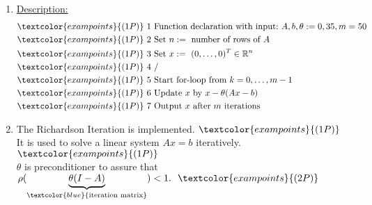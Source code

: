 {\color{solution}
\begin{enumerate}
	\item 
	\underline{Description:}\begin{align*}
	&\textcolor{exampoints}{(1P)}~1~\text{Function declaration with input:}~A,b,\theta:=0,35,m=50\\
	&\textcolor{exampoints}{(1P)}~2~\text{Set}~n:=~\text{number of rows of}~A\\
	&\textcolor{exampoints}{(1P)}~3~\text{Set}~x:=~(0,\dots,0)^T\in\mathbb{R}^n\\
	&\textcolor{exampoints}{(1P)}~4~\text{/}\\
	&\textcolor{exampoints}{(1P)}~5~\text{Start for-loop from}~k=0,\dots,m-1\\
	&\textcolor{exampoints}{(1P)}~6~\text{Update}~x~\text{by}~x-\theta(Ax-b)\\
	&\textcolor{exampoints}{(1P)}~7~\text{Output}~x~\text{after}~m~\text{iterations}
	\end{align*}
	\item 
	The Richardson Iteration is implemented. $\textcolor{exampoints}{(1P)}$\\
	It is used to solve a linear system $Ax=b$ iteratively. $\textcolor{exampoints}{(1P)}$\\
	$\theta$ is preconditioner to assure that $\rho(\underbrace{\theta(I-A)}_{\textcolor{blue}{\text{iteration matrix}}})<1.~~\textcolor{exampoints}{(2P)}$
\end{enumerate}
}